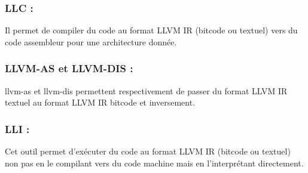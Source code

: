 \documentclass[12pt,titlepage]{article}
\begin{document}
    \subsubsection{ LLC :} Il permet de compiler du code au format LLVM IR (bitcode ou textuel) vers du code assembleur pour une architecture donnée. 
      
    \subsubsection{LLVM-AS et LLVM-DIS : } 
    
    llvm-as et llvm-dis permettent respectivement de passer du format LLVM IR textuel au format LLVM IR bitcode et inversement.

    \subsubsection{ LLI : } 
    
    
    Cet outil permet d’exécuter du code au format LLVM IR (bitcode ou textuel) non pas en le compilant vers du code machine mais en l’interprétant directement.
    
    

      
      
\end{document}
